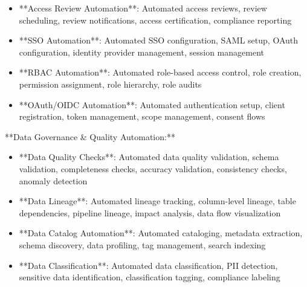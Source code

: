 \documentclass[11pt,a4paper]{article}
\begin{document}
\begin{itemize}
\item **Access Review Automation**: Automated access reviews, review scheduling, review notifications, access certification, compliance reporting
\end{itemize}

\begin{itemize}
\item **SSO Automation**: Automated SSO configuration, SAML setup, OAuth configuration, identity provider management, session management
\end{itemize}

\begin{itemize}
\item **RBAC Automation**: Automated role-based access control, role creation, permission assignment, role hierarchy, role audits
\end{itemize}

\begin{itemize}
\item **OAuth/OIDC Automation**: Automated authentication setup, client registration, token management, scope management, consent flows
\end{itemize}

**Data Governance \& Quality Automation:**

\begin{itemize}
\item **Data Quality Checks**: Automated data quality validation, schema validation, completeness checks, accuracy validation, consistency checks, anomaly detection
\end{itemize}

\begin{itemize}
\item **Data Lineage**: Automated lineage tracking, column-level lineage, table dependencies, pipeline lineage, impact analysis, data flow visualization
\end{itemize}

\begin{itemize}
\item **Data Catalog Automation**: Automated cataloging, metadata extraction, schema discovery, data profiling, tag management, search indexing
\end{itemize}

\begin{itemize}
\item **Data Classification**: Automated data classification, PII detection, sensitive data identification, classification tagging, compliance labeling
\end{itemize}
\end{document}
